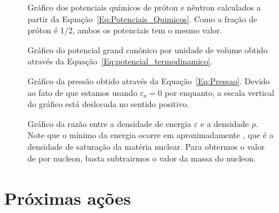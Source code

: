 \begin{enumerate}
\begin{figure}
	
	\caption{Gráfico dos potenciais químicos de próton e nêutron calculados a partir da Equação~\eqref{Eq:Potenciais_Quimicos}. Como a fração de próton é 1/2, ambos os potenciais tem o mesmo valor. \protect}
	\label{Fig:chemical_potential_graph_eNJL1m}
\end{figure}

\FloatBarrier

\begin{figure}
	
	\caption{Gráfico do potencial grand canônico por unidade de volume obtido através da Equação~\eqref{Eq:potencial_termodinamico}. \protect}
	\label{Fig:thermodynamic_potential_graph_eNJL1m}
\end{figure}

\begin{figure}
	
	\caption{Gráfico da pressão obtido através da Equação~\eqref{Eq:Pressao}. Devido ao fato de que estamos usando $\varepsilon_o = 0$ por enquanto, a escala vertical do gráfico está deslocada no sentido positivo. \protect}
	\label{Fig:pressure_graph_eNJL1m}
\end{figure}

\begin{figure}
	
	\caption{Gráfico da razão entre a densidade de energia $\varepsilon$ e a densidade $\rho$. Note que o mínimo da energia ocorre em aproximadamente , que é a densidade de saturação da matéria nuclear. Para obtermos o valor de  por nucleon, basta subtrairmos o valor da massa do nucleon. \protect}
	\label{Fig:energy_by_nucleon_graph_eNJL1m}
\end{figure}

\FloatBarrier


\section{Próximas ações}


\end{enumerate}
